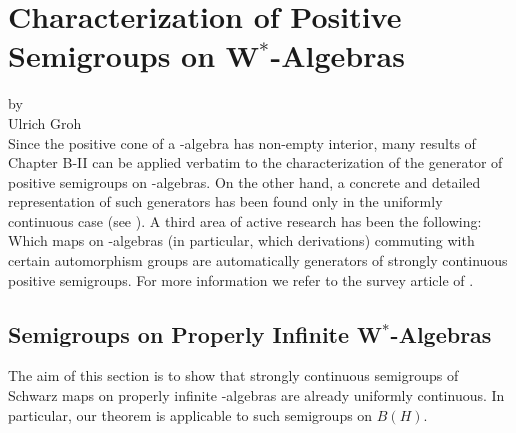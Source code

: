 \chapter{Characterization of Positive Semigroups on \texorpdfstring{W$^{*}$}{W*}-Algebras}\label{chap:d2}
{\Large
\vspace*{-.75cm}
by \\[.25em]
Ulrich Groh
\vspace{.75cm}
\\
}
Since the positive cone of a \CA-algebra has non-empty interior, many results of Chapter B-II can be applied verbatim to the characterization of the generator of positive semigroups on \CA-algebras.
On the other hand, a concrete and detailed representation of such generators has been found only in the uniformly continuous case (see \citet{lindblad:1976}).
A third area of active research has been the following: Which maps on \CA-algebras (in particular, which derivations) commuting with certain automorphism groups are automatically generators of strongly continuous positive semigroups.
For more information we refer to the survey article of \citet{evans:1984}.
\section{Semigroups on Properly Infinite \texorpdfstring{W$^{*}$}{W*}-Algebras}
The aim of this section is to show that strongly continuous semigroups of Schwarz maps on properly infinite \WA-algebras are already uniformly continuous.
In particular, our theorem is applicable to such semigroups on $B(H)$.

